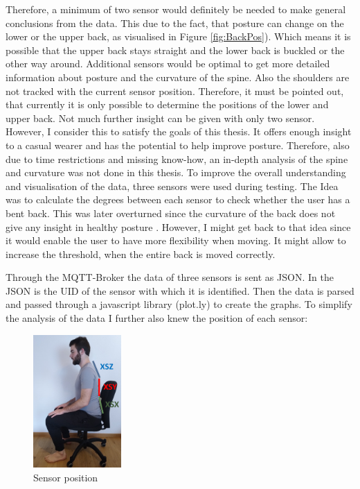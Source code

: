 Therefore, a minimum of two sensor would definitely be needed to make general conclusions from the data. This due to the fact, that posture can change on the lower or the upper back, as visualised in Figure \ref{fig:BackPos}). Which means it is possible that the upper back stays straight and the lower back is buckled or the other way around. Additional sensors would be optimal to get more detailed information about posture and the curvature of the spine. Also the shoulders are not tracked with the current sensor position. Therefore, it must be pointed out, that currently it is only possible to determine the positions of the lower and upper back. Not much further insight can be given with only two sensor. However, I consider this to satisfy the goals of this thesis. It offers enough insight to a casual wearer and has the potential to help improve posture. Therefore, also due to time restrictions and missing know-how, an in-depth analysis of the spine and curvature was not done in this thesis. To improve the overall understanding and visualisation of the data, three sensors were used during testing. The Idea was to calculate the degrees between each sensor to check whether the user has a bent back. This was later overturned since the curvature of the back does not give any insight in healthy posture \cite{SitUpSt77:online}. However, I might get back to that idea since it would enable the user to have more flexibility when moving. It might allow to increase the threshold, when the entire back is moved correctly.

Through the MQTT-Broker the data of three sensors is sent as JSON. In the JSON is the UID of the sensor with which it is identified. Then the data is parsed and passed through a javascript library (plot.ly) \cite{ModernAn18:online} to create the graphs. To simplify the analysis of the data I further also knew the position of each sensor:

\begin{figure}[ht]
  \begin{center}
\includegraphics[width=0.3\textwidth]{images/ChairVisualised.png}
  \end{center}
  \caption{Sensor position}
  \label{fig:SensorPos}
\end{figure}

